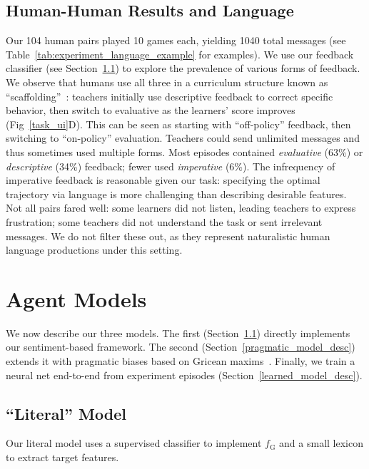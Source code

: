 \documentclass[letterpaper]{article} %
\begin{document}
\subsection{Human-Human Results and Language}
\label{observed_language_in_experiment}
Our 104 human pairs played 10 games each, yielding 1040 total messages (see Table~\ref{tab:experiment_language_example} for examples). We use our feedback classifier (see Section~\ref{literal_model_desc}) to explore the prevalence of various forms of feedback. We observe that humans use all three in a curriculum structure known as ``scaffolding''~\cite{shute_2008}: teachers initially use descriptive feedback to correct specific behavior, then switch to evaluative as the learners' score improves (Fig~\ref{task_ui}D). This can be seen as starting with ``off-policy'' feedback, then switching to ``on-policy'' evaluation. Teachers could send unlimited messages and thus sometimes used multiple forms. Most episodes contained \textit{evaluative} (63\%) or \textit{descriptive}  (34\%) feedback; fewer used \textit{imperative} (6\%). The infrequency of imperative feedback is reasonable given our task: specifying the optimal trajectory via language is more challenging than describing desirable features. Not all pairs fared well: some learners did not listen, leading teachers to express frustration; some teachers did not understand the task or sent irrelevant messages. We do not filter these out, as they represent naturalistic human language productions under this setting. 

\section{Agent Models}
\label{models_section}
\label{stateful_beliefs}
We now describe our three models. The first (Section~\ref{literal_model_desc}) directly implements our sentiment-based framework. The second (Section~\ref{pragmatic_model_desc}) extends it with pragmatic biases based on Gricean maxims~\citep{grice1975logic}. Finally, we train a neural net end-to-end from experiment episodes (Section~\ref{learned_model_desc}).

\subsection{``Literal'' Model}
\label{literal_model_desc}
\label{phrase_classifier}
\label{reference_types_details}
Our literal model uses a supervised classifier to implement $f_\text{G}$ and a small lexicon to extract target features. 
\end{document}
